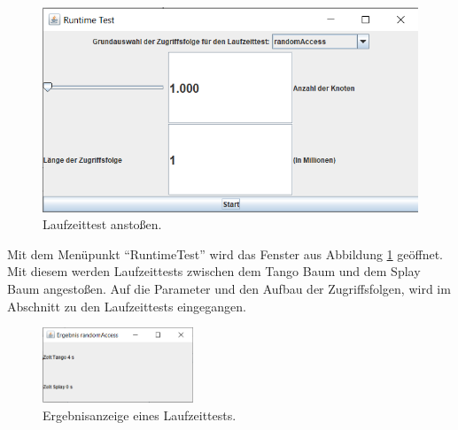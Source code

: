 \documentclass[a4paper,12pt]{article}
\begin{document}
\begin{figure}[h]
	\centering
	\includegraphics[width=1\textwidth]{"Medien/laufzeittest/RuntimeGui"}
	\caption{Laufzeittest anstoßen.}
	\label{fig:RuntimeGui}
\end{figure}

\noindent Mit dem Menüpunkt \enquote{RuntimeTest} wird das Fenster aus Abbildung \ref{fig:RuntimeGui} geöffnet. Mit diesem werden Laufzeittests zwischen dem Tango Baum und dem Splay Baum  angestoßen. Auf die Parameter und den Aufbau der Zugriffsfolgen, wird im Abschnitt zu den Laufzeittests eingegangen.


\begin{figure}[h]
	\centering
	\includegraphics[width=0.4\textwidth]{"Medien/laufzeittest/ResultGUI"}
	\caption{Ergebnisanzeige eines Laufzeittests.}
	\label{fig:ResultGUI}
\end{figure}
\end{document}
